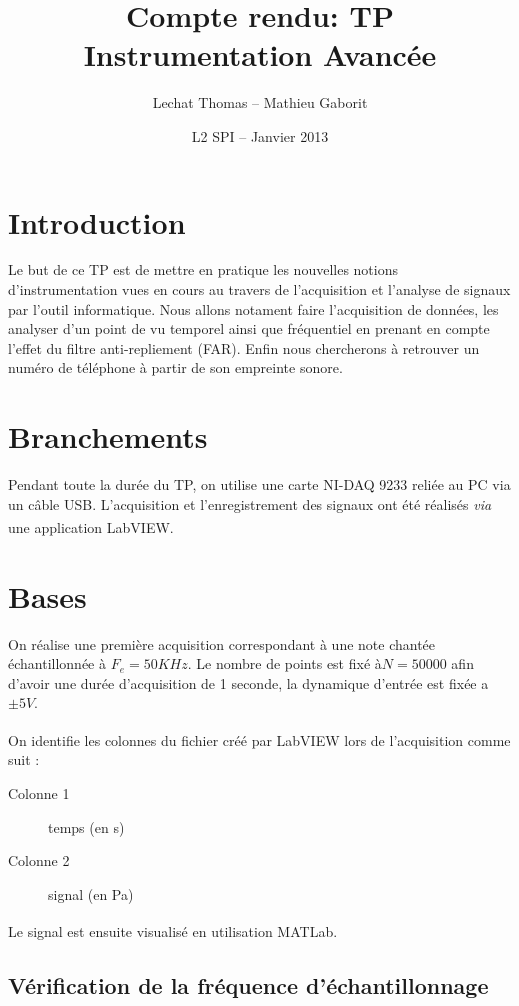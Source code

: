 \documentclass[11pt,a4paper]{article}
\title{Compte rendu: TP Instrumentation Avancée}
\author{Lechat Thomas -- Mathieu Gaborit}
\date{L2 SPI -- Janvier 2013}
\begin{document}
\maketitle

\section*{Introduction}

Le but de ce TP est de mettre en pratique les nouvelles notions d'instrumentation vues en cours au travers de l'acquisition et l'analyse de signaux par l'outil informatique.
Nous allons notament faire l'acquisition de données, les analyser d'un point de vu temporel ainsi que fréquentiel en
prenant en compte l'effet du filtre anti-repliement (FAR).
Enfin nous chercherons à retrouver un numéro de téléphone à partir de son empreinte sonore.

\section{Branchements}

Pendant toute la durée du TP, on utilise une carte NI-DAQ 9233 reliée au PC via un câble USB. L'acquisition et
l'enregistrement des signaux ont été réalisés \textit{via} une application LabVIEW\textsuperscript{\textregistered}.

\section{Bases}

On réalise une première acquisition correspondant à une note chantée échantillonnée à $F_e=50KHz$. Le nombre de points
est fixé à$N=50000$ afin d'avoir une durée d'acquisition de 1 seconde, la dynamique d'entrée est fixée a $\pm 5V$. 
 
On identifie les colonnes du fichier créé par LabVIEW\textsuperscript{\textregistered} lors de l'acquisition comme suit :

\begin{description}
\item[Colonne 1] temps (en s)
\item[Colonne 2] signal (en Pa)
\end{description}

Le signal est ensuite visualisé en utilisation MATLab\textsuperscript{\textregistered}.

\subsection{Vérification de la fréquence d'échantillonnage}
\end{document}
